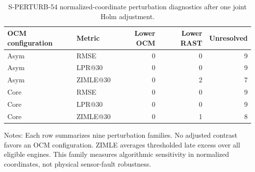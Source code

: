 \begin{table}[!htbp]
\centering
\caption{S-PERTURB-54 normalized-coordinate perturbation diagnostics after one joint Holm adjustment.}
\label{tab:normalized-perturbation-summary}
\small
\begin{tabular}{llrrr}
\toprule
OCM configuration & Metric & Lower OCM & Lower RAST & Unresolved \\
\midrule
Asym & RMSE & 0 & 0 & 9 \\
Asym & LPR@30 & 0 & 0 & 9 \\
Asym & ZIMLE@30 & 0 & 2 & 7 \\
Core & RMSE & 0 & 0 & 9 \\
Core & LPR@30 & 0 & 0 & 9 \\
Core & ZIMLE@30 & 0 & 1 & 8 \\
\bottomrule
\end{tabular}
\begin{minipage}{0.98\linewidth}\footnotesize Notes: Each row summarizes nine perturbation families. No adjusted contrast favors an OCM configuration. ZIMLE averages thresholded late excess over all eligible engines. This family measures algorithmic sensitivity in normalized coordinates, not physical sensor-fault robustness.\end{minipage}
\end{table}
